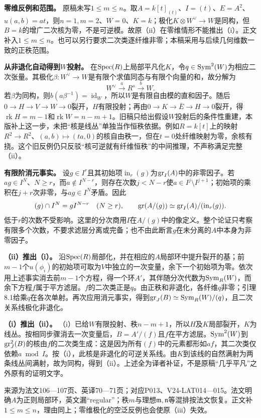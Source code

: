 \textbf{零维反例和范围。} 原稿未写$1\le m\le n$。取$A=k[t]_{(t)}$、$I=(t)$、$E=A^2$、$u(a,b)=at$，则$n=1,m=2$、$W=0$、$K=k$；极化$K\otimes W^\vee\to W$是同构，但$B=k$的增广二次核为零，不是可逆模。故原（ii）在零维情形不能推出（i）。正文补入$1\le m\le n$。也可以另行要求二次类逐纤维非零；本稿采用与后续几何维数一致的正秩范围。

\textbf{从非退化自动得到$W$投射。} 在$\operatorname{Spec}(R)$上局部平凡化$K$，令$q\in\operatorname{Sym}^2(W)$为相应二次张量。其极化$\beta:W^\vee\to W$是有限个求值同态与有限个向量的和，故分解为
\[
W^\vee\xrightarrow{a}R^s\xrightarrow{b}W.
\]
若$\beta$为同构，则$b(a\beta^{-1})=\operatorname{id}_W$，所以$W$是有限自由模的直和因子。随后$0\to H\to V\to W\to0$裂开，$H$有限投射；再由$0\to K\to\bar E\to H\to0$裂开，得$\operatorname{rk}H=m-1$和$\operatorname{rk}W=n-m+1$。旧稿只给出假设$W$投射后的条件性重建，本版补上这一步，未把“核是线丛”单独当作恒秩依据。例如$R=k[t]$上的映射$R^2\to R^2$、$(a,b)\mapsto(ta,0)$的核自由秩一，但在$t=0$处纤维映射为零，余核有挠。这个旧反例仍只反驳“核可逆就有纤维恒秩”的中间推理，不声称满足完整（ii）。

\textbf{有限阶消元事实。} 设$g\in I^r$且其初始项$\operatorname{in}_r(g)$为$\operatorname{gr}_I(A)$中的非零因子。若$ag\in I^N$、$N\ge r$，而$a\notin I^{N-r}$，则存在次数$j<N-r$使$a\in I^j\setminus I^{j+1}$；初始项的乘积在$j+r$次非零，与$ag\in I^N$矛盾。因此
\[
(g)\cap I^N=gI^{N-r}\quad(N\ge r),
\qquad
\operatorname{gr}(A/(g))\simeq\operatorname{gr}_I(A)/(\operatorname{in}_r(g)).
\]
低于$r$的次数不受影响。这里的分次商用$I$在$A/(g)$中的像定义。整个论证只考察有限多个次数，不要求滤层分离或完备；也不由此断言$g$在未分离的$A$中本身为非零因子。

\textbf{（ii）推出（i）。} 沿$\operatorname{Spec}(R)$局部化，并在相应的$A$局部环中提升裂开的基；前$m-1$个$u(\phi_i)$的初始项可取为$V$中独立的一次变量，余下一个初始项为零。依次用上述事实消去前$m-1$个方程，得一个环$A'$，其伴随分次代数为$\operatorname{Sym}_R(W)$，而余下方程$f$属于平方滤层。$f$的二次类正是$q$。由正秩和非退化，各纤维$q$非零；引理8.1给乘$q$在各次单射。再次应用消元事实，得到$\operatorname{gr}_J(B)\simeq\operatorname{Sym}_R(W)/(q)$，且二次关系线极化非退化。

\textbf{（i）推出（ii）。} （i）已给$W$有限投射、秩$n-m+1$，所以$H$及$K$局部裂开，$K$为线丛。按相同步骤消去一次变量后，$B=A'/(f)$且$f$在平方滤层。$\operatorname{Sym}^2(W)$到$\operatorname{gr}_J^2(B)$的核由$f$的二次类生成：这是因为所有$(f)$中的元素都形如$af$，其二次类仅依赖$a\bmod I$。按（i），此核是非退化的可逆关系线。由$K$到该线的自然满射为两条线丛间满射，故为同构，得到（ii）。上述全为译者补证，不是原稿“几乎平凡”之外原有的证明文字。

来源为法文106—107页、英译70—71页；对应P013、V24-LAT014—015。法文明确$A$为正则局部环，英文漏“regular”；秩$m$与理想$\mathfrak m,\mathfrak n$等混排按法文恢复。正文补$1\le m\le n$，理由同上；零维极化的空泛反例也会使原（iii）失效。


